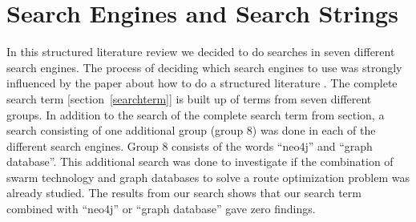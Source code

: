 \chapter{Search Engines and Search Strings}
In this structured literature review we decided to do searches in seven different search engines. The process of deciding which search engines to use was strongly influenced by the paper about how to do a structured literature \citep{kofod2014}. The complete search term [section~\ref{searchterm}] is built up of terms from seven different groups. In addition to the search of the complete search term from section, a search consisting of one additional group (group 8) was done in each of the different search engines. Group 8 consists of the words ``neo4j'' and ``graph database''. This additional search was done to investigate if the combination of swarm technology and graph databases to solve a route optimization problem was already studied. The results from our search shows that our search term combined with ``neo4j'' or ``graph database'' gave zero findings. 


